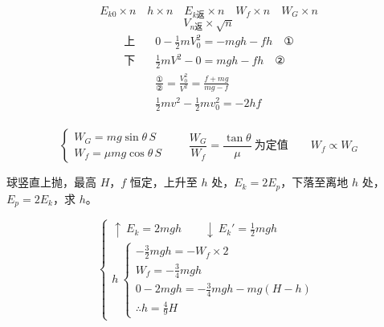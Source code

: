 \[
E_{k0}\times n\quad h\times n\quad E_{k\text{返}}\times n\quad W_f\times n\quad W_G\times n
\]
\[
V_{n\text{返}}\times\sqrt{n}
\]
\begin{align*}
\text{上}\quad & 0-\tfrac12 mV_0^2=-mgh-fh \quad\text{①}\\
\text{下}\quad & \tfrac12 mV^2-0=mgh-fh \quad\text{②}\\
& \frac{\text{①}}{\text{②}}=\frac{V_0^2}{V^2}=\frac{f+mg}{mg-f}\\
& \tfrac12 mv^2-\tfrac12 mv_0^2=-2hf
\end{align*}
\\
\[
\begin{cases}
W_G = mg\sin\theta\,S\\
W_f = \mu mg\cos\theta\,S
\end{cases}
\qquad
\frac{W_G}{W_f}=\frac{\tan\theta}{\mu}\ \text{为定值}
\qquad
W_f\propto W_G
\]
\begin{problem}
球竖直上抛，最高 $H$，$f$ 恒定，上升至 $h$ 处，$E_k=2E_p$，下落至离地 $h$ 处，$E_p=2E_k$，求 $h$。
\begin{solution}
\[
\left\{
\begin{array}{l}
\uparrow\ E_k=2mgh\qquad \downarrow\ E_k'=\tfrac12 mgh\\[6pt]
h\ \left\{
\begin{array}{l}
-\tfrac32 mgh=-W_f\times 2\\
W_f=-\tfrac34 mgh\\
0-2mgh=-\tfrac34 mgh-mg(H-h)\\
\therefore h=\tfrac49 H
\end{array}
\right.
\end{array}
\right.
\]
\end{solution}
\end{problem}
